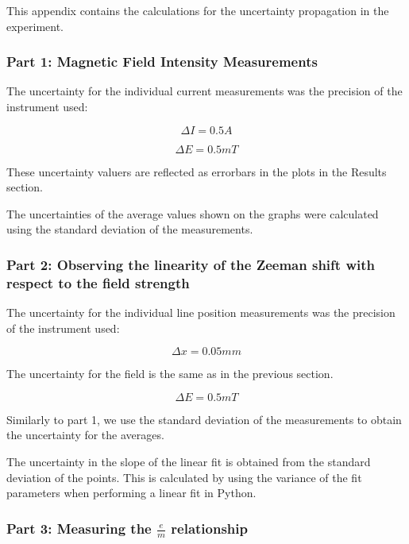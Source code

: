 This appendix contains the calculations for the uncertainty propagation in the experiment.

\subsubsection{Part 1: Magnetic Field Intensity Measurements}

The uncertainty for the individual current measurements was the precision of the instrument used:

\begin{equation}
    \Delta I = 0.5 A
\end{equation}

\begin{equation}
    \Delta E = 0.5 mT
\end{equation}

These uncertainty valuers are reflected as errorbars in the plots in the Results section.

The uncertainties of the average values shown on the graphs were calculated using the standard deviation of the measurements.

\subsubsection{Part 2: Observing the linearity of the Zeeman shift with respect to the field strength}

The uncertainty for the individual line position measurements was the precision of the instrument used:

\begin{equation}
    \Delta x = 0.05 mm
\end{equation}

The uncertainty for the field is the same as in the previous section.

\begin{equation}
    \Delta E = 0.5 mT
\end{equation}

Similarly to part 1, we use the standard deviation of the measurements to obtain the uncertainty for the averages.

The uncertainty in the slope of the linear fit is obtained from the standard deviation of the points.
This is calculated by using the variance of the fit parameters when performing a linear fit in Python.

\subsubsection{Part 3: Measuring the $\frac{e}{m}$ relationship}

